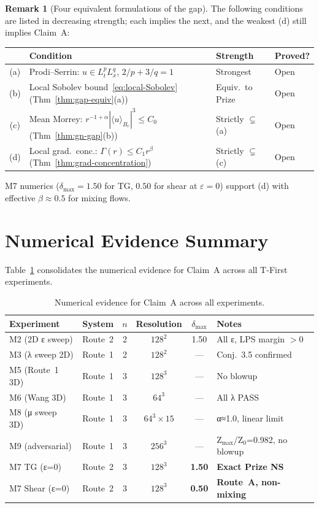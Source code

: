 \documentclass[11pt]{article}
\theoremstyle{definition}
\newtheorem{remark}[theorem]{Remark}
\theoremstyle{remark}
\newcommand{\dlt}{\delta}
\begin{document}
\begin{remark}[Four equivalent formulations of the gap]
  The following conditions are listed in decreasing strength; each implies the next,
  and the weakest (d) still implies Claim~A:
  \begin{center}
  \begin{tabular}{@{}clll@{}}
  \toprule
  & Condition & Strength & Proved? \\
  \midrule
  (a) & Prodi--Serrin: $u\in L^p_tL^q_x$, $2/p+3/q=1$ &
    Strongest & Open \\
  (b) & Local Sobolev bound~\eqref{eq:local-Sobolev} (Thm~\ref{thm:gap-equiv}(a)) &
    Equiv.\ to Prize & Open \\
  (c) & Mean Morrey: $r^{-1+\alpha}|\langle u\rangle_{B_r}|^3\leq C_0$
       (Thm~\ref{thm:gn-gap}(b)) &
    Strictly $\subsetneq$ (a) & Open \\
  (d) & Local grad.\ conc.: $\Gamma(r)\leq C_1 r^\beta$
       (Thm~\ref{thm:grad-concentration}) &
    Strictly $\subsetneq$ (c) & Open \\
  \bottomrule
  \end{tabular}
  \end{center}
  M7 numerics ($\dlt_{\max}=1.50$ for TG, $0.50$ for shear at $\varepsilon=0$)
  support (d) with effective $\beta\approx 0.5$ for mixing flows.
\end{remark}

\section{Numerical Evidence Summary}
\label{sec:numerics}

Table~\ref{tab:all-evidence} consolidates the numerical evidence for
Claim~A across all T-First experiments.

\begin{table}[h]
\centering
\caption{Numerical evidence for Claim~A across all experiments.}
\label{tab:all-evidence}
\begin{tabular}{@{}llcccl@{}}
\toprule
Experiment & System & $n$ & Resolution & $\dlt_{\max}$ & Notes \\
\midrule
M2 (2D ε sweep) & Route~2 & 2 & $128^2$ & 1.50 & All ε, LPS margin $>0$ \\
M3 (λ sweep 2D) & Route~1 & 2 & $128^2$ & — & Conj.~3.5 confirmed \\
M5 (Route~1 3D) & Route~1 & 3 & $128^3$ & — & No blowup \\
M6 (Wang 3D) & Route~1 & 3 & $64^3$ & — & All λ PASS \\
M8 (μ sweep 3D) & Route~1 & 3 & $64^3{\times}15$ & — & α≈1.0, linear limit \\
M9 (adversarial) & Route~1 & 3 & $256^3$ & — & Z$_{\max}$/Z$_0$=0.982, no blowup \\
\midrule
M7 TG (ε=0) & Route~2 & 3 & $128^3$ & \textbf{1.50} & \textbf{Exact Prize NS} \\
M7 Shear (ε=0) & Route~2 & 3 & $128^3$ & \textbf{0.50} & \textbf{Route~A, non-mixing} \\
\bottomrule
\end{tabular}
\end{table}
\end{document}
